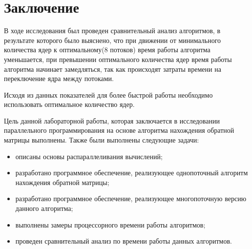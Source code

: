 \chapter*{Заключение}

В ходе исследования был проведен сравнительный анализ алгоритмов, в результате
которого было выяснено, что при движении от минимального количества ядер к оптимальному(8 потоков) время работы алгоритма
уменьшается, при превышении оптимального количества ядер время работы алгоритма начинает замедляться, так как происходят затраты времени
на переключение ядра между потоками.

Исходя из данных показателей для более быстрой работы необходимо использовать оптимальное количество ядер.

Цель данной лабораторной работы, которая заключается в исследовании
параллельного программирования на основе алгоритма
нахождения обратной матрицы выполнены.
Также были выполнены следующие задачи:
\begin{itemize}[left=\parindent]
    \item описаны основы распараллеливания вычислений;
    \item разработано программное обеспечение, реализующее однопоточный алгоритм нахождения обратной матрицы;
    \item разработано программное обеспечение, реализующее многопоточную
        версию данного алгоритма;
    \item выполнены замеры процессорного времени работы алгоритмов;
    \item проведен сравнительный анализ по времени работы данных алгоритмов.
\end{itemize}





